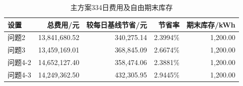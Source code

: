 \begin{table}[H]\centering\small\caption{主方案334日费用及自由期末库存}\label{tab:annual}
\begin{tabular}{lrrrr}\toprule
设置 & 总费用/元 & 较每日基线节省/元 & 节省率 & 期末库存/kWh\\\midrule
问题2 & 13,841,680.52 & 340,275.14 & 2.3994\% & 1,200.00\\
问题3 & 13,459,169.01 & 368,845.09 & 2.6674\% & 1,200.00\\
问题4-2 & 14,652,127.40 & 358,474.06 & 2.3881\% & 1,200.00\\
问题4-3 & 14,249,362.50 & 432,305.95 & 2.9445\% & 1,200.00\\
\bottomrule\end{tabular}\end{table}
